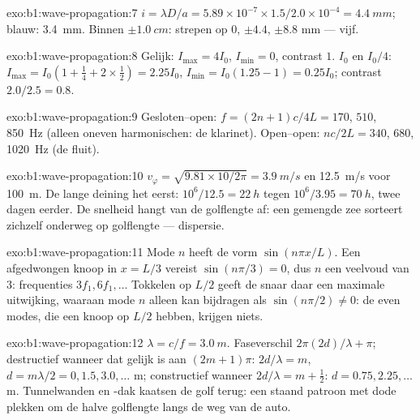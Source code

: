 \begin{solution}{exo:b1:wave-propagation:7}
$i = \lambda D/a = 5.89\times10^{-7} \times 1.5/2.0\times10^{-4} =
\qty{4.4}{mm}$; blauw: \qty{3.4}{mm}. Binnen $\pm\qty{1.0}{cm}$: strepen op
$0$, $\pm 4.4$, $\pm 8.8$ mm --- vijf.
\end{solution}

\begin{solution}{exo:b1:wave-propagation:8}
Gelijk: $I_{\max} = 4I_0$, $I_{\min} = 0$, contrast $1$. $I_0$ en $I_0/4$:
$I_{\max} = I_0(1 + \tfrac14 + 2 \times \tfrac12) = 2.25I_0$, $I_{\min} =
I_0(1.25 - 1) = 0.25I_0$; contrast $2.0/2.5 = 0.8$.
\end{solution}

\begin{solution}{exo:b1:wave-propagation:9}
Gesloten--open: $f = (2n + 1)c/4L = 170$, $510$, \qty{850}{Hz} (alleen oneven
harmonischen: de klarinet). Open--open: $nc/2L = 340$, $680$,
\qty{1020}{Hz} (de fluit).
\end{solution}

\begin{solution}{exo:b1:wave-propagation:10}
$v_\varphi = \sqrt{9.81 \times 10/2\pi} = \qty{3.9}{m/s}$ en
\qty{12.5}{m/s} voor \qty{100}{m}. De lange deining het eerst: $10^6/12.5 =
\qty{22}{h}$ tegen $10^6/3.95 = \qty{70}{h}$, twee dagen eerder. De snelheid
hangt van de golflengte af: een gemengde zee sorteert zichzelf onderweg op
golflengte --- dispersie.
\end{solution}

\begin{solution}{exo:b1:wave-propagation:11}
Mode $n$ heeft de vorm $\sin(n\pi x/L)$. Een afgedwongen knoop in $x = L/3$ vereist
$\sin(n\pi/3) = 0$, dus $n$ een veelvoud van $3$: frequenties $3f_1,
6f_1, \dots$ Tokkelen op $L/2$ geeft de snaar daar een maximale uitwijking,
waaraan mode $n$ alleen kan bijdragen als $\sin(n\pi/2) \neq 0$:
de even modes, die een knoop op $L/2$ hebben, krijgen niets.
\end{solution}

\begin{solution}{exo:b1:wave-propagation:12}
$\lambda = c/f = \qty{3.0}{m}$. Faseverschil $2\pi(2d)/\lambda + \pi$;
destructief wanneer dat gelijk is aan $(2m + 1)\pi$: $2d/\lambda = m$,
$d = m\lambda/2 = 0, 1.5, 3.0, \dots$ m; constructief wanneer $2d/\lambda =
m + \tfrac12$: $d = 0.75, 2.25, \dots$ m. Tunnelwanden en -dak kaatsen
de golf terug: een staand patroon met dode plekken om de halve golflengte langs
de weg van de auto.
\end{solution}

